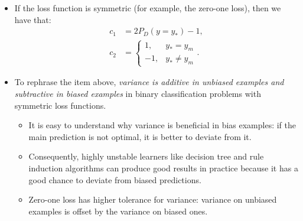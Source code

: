 \documentclass[10pt]{article}
\begin{document}
\begin{itemize}
\begin{proof}
      Using \eqref{lty-c0}, we have that:
      \begin{align*}
        E_{D,t}[L(t,y)]
        &= E_D[E_t[L(t,y)]] \\
        &= E_D[E_t[L(y_*, y) + c_0 L(t,y_*)]] \\
        &= E_D[L(y_*, y) + c_0 E_t[ L(t,y_*)]]] \\
        &= E_D[L(y_*, y)] + E_D[c_0] E_t[ L(t,y_*) ]]].
      \end{align*}
      The next to last line comes from the fact that $L(y_*,y)$ and $c_0$ does not depend on $t$. The last line comes from the fact that $y_*$ and $t$ does not depends on the training dataset $D$.

      Substituting \eqref{lyy-c2}, we have that:
      \begin{align*}        
        E_{D,t}[L(t,y)]
        &= E_D[L(y_*,y_m) + c_2 L(y_m, y)] + E_D[c_0] E_t[ L(t,y_*) ]]] \\
        &= L(y_*,y_m) + c_2 E_D[ L(y_m,y)] + E_D[c_0] E_t[ L(t,y_*) ] \\
        &= B(x) + c_2 V(x) + E_D[c_0] N(x).
      \end{align*}
      Now,
      \begin{align*}
        E_D[c_0] &= P_D(y = y_*) - \frac{L(y_*,y)}{L(y,y*)} P_D(y \neq y_*) = c_1.
      \end{align*}
      As a result, we have that:
      \begin{align*}
        E_{D,t}[L(t,y)] = c_1 N(x) + B(x) + c_2 V(x)
      \end{align*}
      as desired.
    \end{proof}

    \item If the loss function is symmetric (for example, the zero-one loss), then we have that:
    \begin{align*}
      c_1 &= 2 P_D(y=y_*) - 1,\\
      c_2 &= \begin{cases}
        1, & y_* = y_m \\
        -1, & y_* \neq y_m
      \end{cases}.
    \end{align*}
    
    \item To rephrase the item above, \emph{variance is additive in unbiased examples and subtractive in biased examples} in binary classification problems with symmetric loss functions.
    \begin{itemize}
      \item It is easy to understand why variance is beneficial in bias examples: if the main prediction is not optimal, it is better to deviate from it.
      \item Consequently, highly unstable learners like decision tree and rule induction algorithms can produce good results in practice because it has a good chance to deviate from biased predictions.
      \item Zero-one loss has higher tolerance for variance: variance on unbiased examples is offset by the variance on biased ones. 
    \end{itemize}


\end{itemize}
\end{document}
